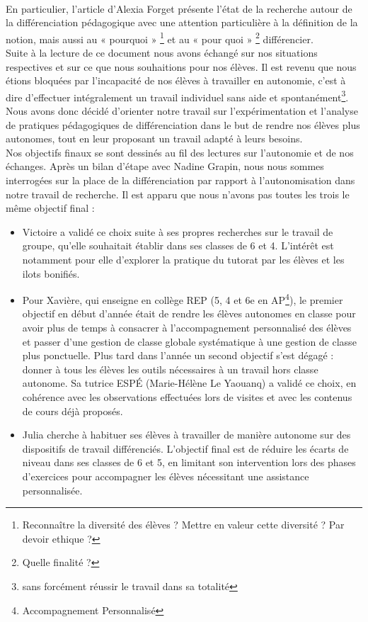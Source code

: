 \paragraph{}En particulier, l'article d'Alexia Forget\cite{cnesco_etat_lieux} présente l'état de la recherche autour de la différenciation pédagogique avec une attention particulière à la définition de la notion, mais aussi au « pourquoi » \footnote{Reconnaître la diversité des élèves ? Mettre en valeur cette diversité ? Par devoir ethique ?} et au « pour quoi » \footnote{Quelle finalité ?} différencier.\\
Suite à la lecture de ce document nous avons échangé sur nos situations respectives et sur ce que nous souhaitions pour nos élèves. Il est revenu que nous étions bloquées par l'incapacité de nos élèves à travailler en autonomie, c'est à dire d'effectuer intégralement un travail individuel sans aide et spontanément\footnote{sans forcément réussir le travail dans sa totalité}. Nous avons donc décidé d'orienter notre travail sur l'expérimentation et l'analyse de pratiques pédagogiques de différenciation dans le but de rendre nos élèves plus autonomes, tout en leur proposant un travail adapté à leurs besoins.\\
Nos objectifs finaux se sont dessinés au fil des lectures sur l'autonomie\cite{Meirieu_autonomie}\cite{ilots_bonifies} et de nos échanges. Après un bilan d'étape avec Nadine Grapin, nous nous sommes interrogées sur la place de la différenciation par rapport à l’autonomisation dans notre travail de recherche. Il est apparu que nous n'avons pas toutes les trois le même objectif final :
\begin{itemize}
	\item Victoire a validé ce choix suite à ses propres recherches sur le travail de groupe, qu’elle souhaitait établir dans ses classes de 6 et 4. L’intérêt est notamment pour elle d’explorer la pratique du tutorat par les élèves et les ilots bonifiés.
	\item Pour Xavière, qui enseigne en collège REP (5, 4 et 6{e} en AP\footnote{Accompagnement Personnalisé}),  le premier objectif en début d'année était de rendre les élèves autonomes en classe pour avoir plus de temps à consacrer à l’accompagnement personnalisé des élèves et passer d’une gestion de classe globale systématique à une gestion de classe plus ponctuelle. Plus tard dans l'année un second objectif s'est dégagé : donner à tous les élèves les outils nécessaires à un travail hors classe autonome. Sa tutrice ESPÉ (Marie-Hélène Le Yaouanq) a validé ce choix, en cohérence avec les observations effectuées lors de visites et avec les contenus de cours déjà proposés.
	\item  Julia cherche à habituer ses élèves à travailler de manière autonome sur des dispositifs de travail différenciés. L'objectif final est de réduire les écarts de niveau dans ses classes de 6 et 5, en limitant son intervention lors des phases d’exercices pour accompagner les élèves nécessitant une assistance personnalisée.
\end{itemize}

